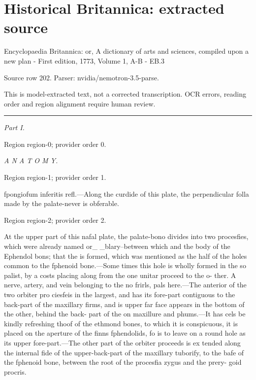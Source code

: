 \documentclass[11pt]{article}
\begin{document}
\section*{Historical Britannica: extracted source}
Encyclopaedia Britannica: or, A dictionary of arts and sciences, compiled upon a new plan - First edition, 1773, Volume 1, A-B - EB.3\par
{\small Source row 202. Parser: nvidia/nemotron-3.5-parse.\par}
{\small This is model-extracted text, not a corrected transcription. OCR errors, reading order and region alignment require human review.\par}
\hrule\medskip
{\small\itshape Part I.\par}

{\scriptsize\color{gray} Region region-0; provider order 0.\par}
\medskip

{\small\itshape A N A T O M Y.\par}

{\scriptsize\color{gray} Region region-1; provider order 1.\par}
\medskip

fpongiofum inferitis refl.—Along the curdide of this
plate, the perpendicular folla made by the palate-never
is obferable.
\par

{\scriptsize\color{gray} Region region-2; provider order 2.\par}
\medskip

At the upper part of this nafal plate, the palate-bono
divides into two procesfies, which were already named or\_
\_blary--between which and the body of the Ephendol bons; that the is formed, which was mentioned as the
half of the holes common to the fphenoid bone.—Some
times this hole is wholly formed in the so palist, by a
costs placing along from the one unitar proceed to the o-
ther. A nerve, artery, and vein belonging to the no
frirls, pals here.—The anterior of the two orbiter pro
ciesfeis in the largest, and has its fore-part contiguous to
the back-part of the maxillary firms, and is upper far
face appears in the bottom of the other, behind the back-
part of the on maxillure and phums.—It has cels be
kindly refreshing thoof of the ethmond bones, to which it
is conspicuous, it is placed on the aperture of the finns
fphendolids, fo is to leave on a round hole as its upper
fore-part.—The other part of the orbiter proceeds is ex
tended along the internal fide of the upper-back-part of
the maxillary tuborify, to the bafe of the fphenoid bone,
between the root of the procesfia zygus and the prery-
goid procris.
\par
\end{document}
